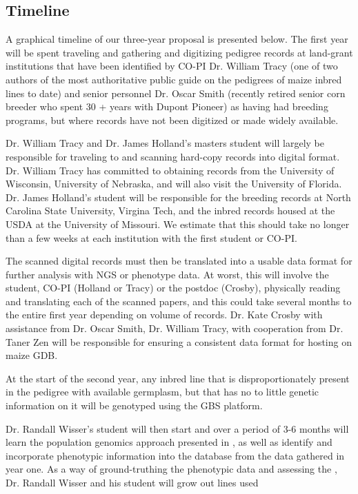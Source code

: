 \documentclass[12pt]{article}
\begin{document}
\subsection*{Timeline}
A graphical timeline of our three-year proposal is presented below.
The first year will be spent traveling and gathering and digitizing pedigree records at land-grant institutions that have been identified by CO-PI Dr. William Tracy (one of two authors of the most authoritative public guide on the pedigrees of maize inbred lines to date) and senior personnel Dr. Oscar Smith (recently retired senior corn breeder who spent 30 + years with Dupont Pioneer) as having had breeding programs, but where records have not been digitized or made widely available. 
\par Dr. William Tracy and Dr. James Holland's masters student will largely be responsible for traveling to and scanning hard-copy records into digital format. Dr. William Tracy has committed to obtaining records from the University of Wisconsin, University of Nebraska, and will also visit the University of Florida. Dr. James Holland's student will be responsible for the breeding records at North Carolina State University, Virgina Tech, and the inbred records housed at the USDA at the University of Missouri. We estimate that this should take no longer than a few weeks at each institution with the first student or CO-PI. 
\par The scanned digital records must then be translated into a usable data format for further analysis with NGS or phenotype data. At worst, this will involve the student, CO-PI (Holland or Tracy) or the postdoc (Crosby), physically reading and translating each of the scanned papers, and this could take several months to the entire first year depending on volume of records. Dr. Kate Crosby with assistance from Dr. Oscar Smith, Dr. William Tracy, with cooperation from Dr. Taner Zen will be responsible for ensuring a consistent data format for hosting on maize GDB.
\par At the start of the second year, any inbred line that is disproportionately present in the pedigree with available germplasm, but that has no to little genetic information on it will be genotyped using the GBS platform. 
\par
Dr. Randall Wisser's student will then start and over a period of 3-6 months will learn the population genomics approach presented in \citep{Berg:2014bs}, as well as identify and incorporate phenotypic information into the database from the data gathered in year one. As a way of ground-truthing the phenotypic data and assessing the , Dr. Randall Wisser and his student will grow out lines used 





\end{document}
